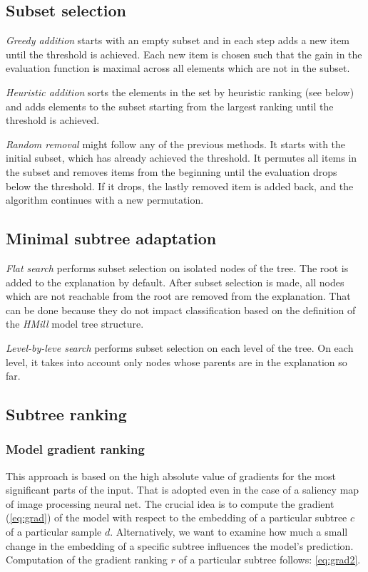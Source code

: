 \subsection{Subset selection}
\emph{Greedy addition} starts with an empty subset and in each step adds a new item until the threshold is achieved. Each new item is chosen such that the gain in the evaluation function is maximal across all elements which are not in the subset.

\emph{Heuristic addition} sorts the elements in the set by heuristic ranking (see below) and adds elements to the subset starting from the largest ranking until the threshold is achieved.

\emph{Random removal} might follow any of the previous methods. It starts with the initial subset, which has already achieved the threshold. It permutes all items in the subset and removes items from the beginning until the evaluation drops below the threshold. If it drops, the lastly removed item is added back, and the algorithm continues with a new permutation.
\subsection{Minimal subtree adaptation}
\emph{Flat search} performs subset selection on isolated nodes of the tree. The root is added to the explanation by default. After subset selection is made, all nodes which are not reachable from the root are removed from the explanation. That can be done because they do not impact classification based on the definition of the \emph{HMill} model tree structure.

\emph{Level-by-leve search} performs subset selection on each level of the tree. On each level, it takes into account only nodes whose parents are in the explanation so far.

\subsection{Subtree ranking}
\subsubsection{Model gradient ranking}
This approach is based on the high absolute value of gradients for the most significant parts of the input. That is adopted even in the case of a saliency map of image processing neural net. The crucial idea is to compute the gradient (\ref{eq:grad}) of the model with respect to the embedding of a particular subtree $c$ of a particular sample $d$. Alternatively, we want to examine how much a small change in the embedding of a specific subtree influences the model's prediction. Computation of the gradient ranking $r$ of a particular subtree follows: \ref{eq:grad2}.

